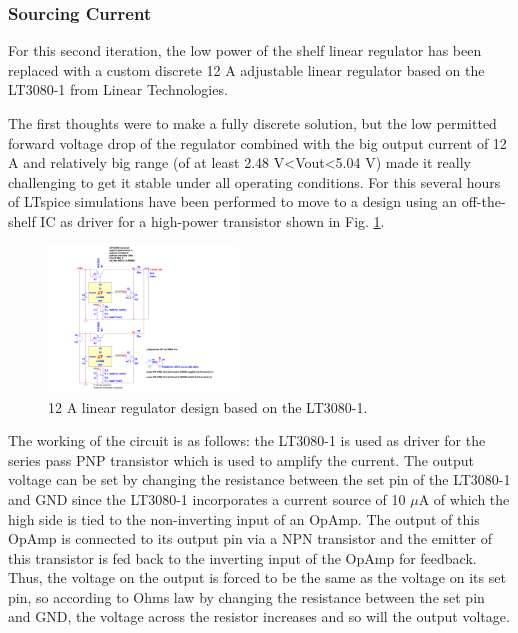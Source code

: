 \subsubsection{Sourcing Current}
For this second iteration, the low power of the shelf linear regulator has been replaced with a custom discrete 12 A adjustable linear regulator based on the LT3080-1 from Linear Technologies.

The first thoughts were to make a fully discrete solution, but the low permitted forward voltage drop of the regulator combined with the big output current of 12 A and relatively big range (of at least 2.48 V\textless Vout\textless 5.04 V) made it really challenging to get it stable under all operating conditions. For this several hours of LTspice simulations have been performed to move to a design using an off-the-shelf IC as driver for a high-power transistor shown in Fig. \ref{fig:LT3080-1_LinRegSchematic}.

\begin{figure}[h!]
    \centering
    \includegraphics[width=0.45\textwidth]{LT3080-1_LinRegSchematic.pdf}
    \caption{12 A linear regulator design based on the LT3080-1.}
    \label{fig:LT3080-1_LinRegSchematic}
\end{figure}

The working of the circuit is as follows: the LT3080-1 is used as driver for the series pass PNP transistor which is used to amplify the current.
The output voltage can be set by changing the resistance between the set pin of the LT3080-1 and GND since the LT3080-1 incorporates a current source of 10 $\mu$A of which the high side is tied to the non-inverting input of an OpAmp. The output of this OpAmp is connected to its output pin via a NPN transistor and the emitter of this transistor is fed back to the inverting input of the OpAmp for feedback. Thus, the voltage on the output is forced to be the same as the voltage on its set pin, so according to Ohms law by changing the resistance between the set pin and GND, the voltage across the resistor increases and so will the output voltage.

